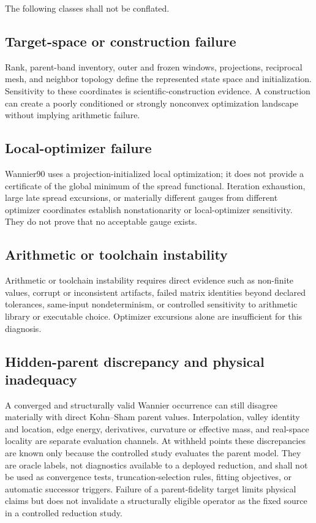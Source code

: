 \documentclass[11pt]{article}
\begin{document}
The following classes shall not be conflated.

\subsection{Target-space or construction failure}

Rank, parent-band inventory, outer and frozen windows, projections, reciprocal mesh, and
neighbor topology define the represented state space and initialization.  Sensitivity to
these coordinates is scientific-construction evidence.  A construction can create a
poorly conditioned or strongly nonconvex optimization landscape without implying
arithmetic failure.

\subsection{Local-optimizer failure}

Wannier90 uses a projection-initialized local optimization; it does not provide a
certificate of the global minimum of the spread functional.  Iteration exhaustion,
large late spread excursions, or materially different gauges from different optimizer
coordinates establish nonstationarity or local-optimizer sensitivity.  They do not prove
that no acceptable gauge exists.

\subsection{Arithmetic or toolchain instability}

Arithmetic or toolchain instability requires direct evidence such as non-finite values,
corrupt or inconsistent artifacts, failed matrix identities beyond declared tolerances,
same-input nondeterminism, or controlled sensitivity to arithmetic library or executable
choice.  Optimizer excursions alone are insufficient for this diagnosis.

\subsection{Hidden-parent discrepancy and physical inadequacy}

A converged and structurally valid Wannier occurrence can still disagree materially
with direct Kohn--Sham parent values.  Interpolation, valley identity and location, edge
energy, derivatives, curvature or effective mass, and real-space locality are separate
evaluation channels.  At withheld points these discrepancies are known only because the
controlled study evaluates the parent model.  They are oracle labels, not diagnostics
available to a deployed reduction, and shall not be used as convergence tests,
truncation-selection rules, fitting objectives, or automatic successor triggers.
Failure of a parent-fidelity target limits physical claims but does not invalidate a
structurally eligible operator as the fixed source in a controlled reduction study.
\end{document}
